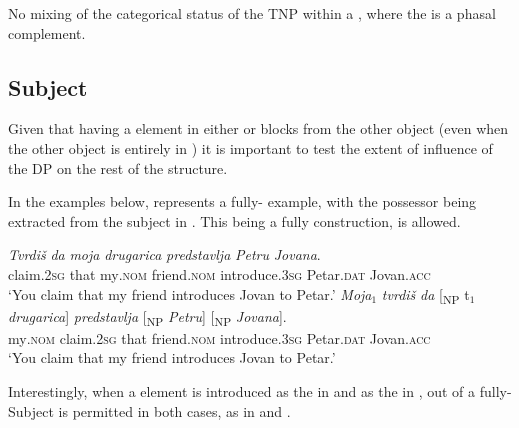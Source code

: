 \documentclass[output=paper,hidelinks,newtxmath,]{langscibook}
\begin{document}
\ea\label{15:ex26}
  No mixing of the categorical status of the TNP within a , where the  is a phasal complement.
\z

\subsection{Subject}\label{15:s5.3}

Given that having a  element in either  or  blocks  from the other object (even when the other object is entirely in ) it is important to test the extent of influence of the  DP on the rest of the structure.

In the examples below,  represents a fully- example, with the possessor being extracted from the subject in . This being a fully  construction,  is allowed.

\ea \label{15:ex27}
	\ea\label{15:ex27a}
    \gll \textit{Tvrdiš} \textit{da} \textit{moja} \textit{drugarica} \textit{predstavlja} \textit{Petru} \textit{Jovana}.\\          
         claim\textsc{.2sg} that my\textsc{.nom} friend\textsc{.nom} introduce\textsc{.3sg} Petar\textsc{.dat} Jovan\textsc{.acc}\\
         \glt `You claim that my friend introduces Jovan to Petar.'
	\ex\label{15:ex27b}
    \gll \textit{Moja}$_1$ \textit{tvrdiš} \textit{da} [\textsubscript{NP} t$_1$ \textit{drugarica}] \textit{predstavlja} [\textsubscript{NP} \textit{Petru}] [\textsubscript{NP} \textit{Jovana}].\\
         my\textsc{.nom} claim\textsc{.2sg} that {} {} friend\textsc{.nom} introduce\textsc{.3sg} {} Petar\textsc{.dat} {} Jovan\textsc{.acc}\\ 
         \glt `You claim that my friend introduces Jovan to Petar.'
	\z
\z

\noindent Interestingly, when a  element is introduced as the  in  and as the  in ,  out of a fully- Subject is permitted in both cases, as in  and .
\end{document}
